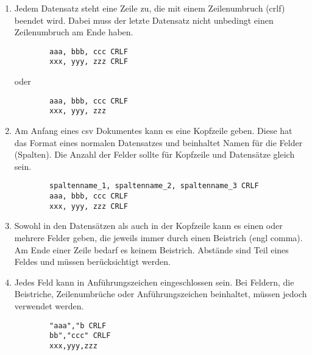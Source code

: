 \begin{enumerate}{}
	
	\item Jedem Datensatz steht eine Zeile zu, die mit einem Zeilenumbruch (\ac{crlf}) beendet wird. Dabei muss der letzte Datensatz nicht unbedingt einen Zeilenumbruch am Ende haben. \zB 
	\begin{lstlisting}
		aaa, bbb, ccc CRLF
		xxx, yyy, zzz CRLF
	\end{lstlisting}
	oder
	\begin{lstlisting}
		aaa, bbb, ccc CRLF
		xxx, yyy, zzz
	\end{lstlisting}
	
	\item Am Anfang eines \acs{csv} Dokumentes kann es eine Kopfzeile geben. Diese hat das Format eines normalen Datensatzes und beinhaltet Namen für die Felder (Spalten). Die Anzahl der Felder sollte für Kopfzeile und Datensätze gleich sein. \zB
	\begin{lstlisting}
		spaltenname_1, spaltenname_2, spaltenname_3 CRLF
		aaa, bbb, ccc CRLF
		xxx, yyy, zzz CRLF
	\end{lstlisting}
	
	\item Sowohl in den Datensätzen als auch in der Kopfzeile kann es einen oder mehrere Felder geben, die jeweils immer durch einen Beistrich (\acs{engl} comma). Am Ende einer Zeile bedarf es keinem Beistrich. Abstände sind Teil eines Feldes und müssen berücksichtigt werden.
	
	\item Jedes Feld kann in Anführungszeichen eingeschlossen sein. Bei Feldern, die Beistriche, Zeilenumbrüche oder Anführungszeichen beinhaltet, müssen jedoch verwendet werden. \zB
	\begin{lstlisting}
		"aaa","b CRLF
		bb","ccc" CRLF
		xxx,yyy,zzz
	\end{lstlisting}

\end{enumerate}



